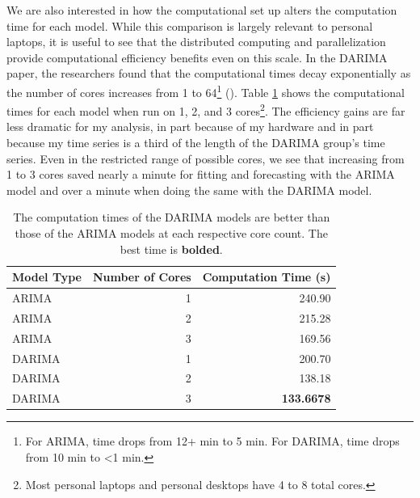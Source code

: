 \documentclass[
]{article}
\begin{document}
We are also interested in how the computational set up alters the computation time for each model. While this comparison is largely relevant to personal laptops, it is useful to see that the distributed computing and parallelization provide computational efficiency benefits even on this scale. In the DARIMA paper, the researchers found that the computational times decay exponentially as the number of cores increases from 1 to 64\footnote{For ARIMA, time drops from 12+ min to 5 min. For DARIMA, time drops from 10 min to <1 min.} (\cite[p.~30]{wang_distributed_2020}). Table \ref{tab-arima-darima-comp-cores} shows the computational times for each model when run on 1, 2, and 3 cores\footnote{Most personal laptops and personal desktops have 4 to 8 total cores.}. The efficiency gains are far less dramatic for my analysis, in part because of my hardware and in part because my time series is a third of the length of the DARIMA group's time series. Even in the restricted range of possible cores, we see that increasing from 1 to 3 cores saved nearly a minute for fitting and forecasting with the ARIMA model and over a minute when doing the same with the DARIMA model. 

\begin{table}[h]
  \begin{center}
    \begin{tabular}{l | r r}
      \hline
      Model Type & Number of Cores & Computation Time (s) \\
      \hline
      ARIMA & 1 & 240.90 \\
      ARIMA & 2 & 215.28 \\
      ARIMA & 3 & 169.56 \\
      DARIMA & 1 & 200.70 \\
      DARIMA & 2 & 138.18 \\
      DARIMA & 3 & \textbf{133.6678} \\
      \hline
    \end{tabular}
    \caption{The computation times of the DARIMA models are better than those of the ARIMA models at each respective core count. The best time is \textbf{bolded}.}
    \label{tab-arima-darima-comp-cores}
  \end{center}
\end{table}
\end{document}
